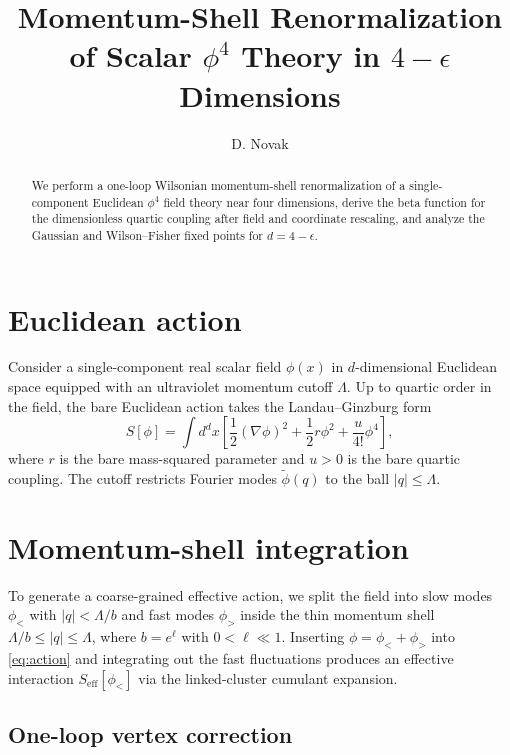 \documentclass{article}
\title{Momentum-Shell Renormalization of Scalar $\phi^4$ Theory in $4-\epsilon$ Dimensions}
\author{D. Novak}
\date{}
\begin{document}
\maketitle

\begin{abstract}
We perform a one-loop Wilsonian momentum-shell renormalization of a single-component
Euclidean $\phi^4$ field theory near four dimensions, derive the beta function for
the dimensionless quartic coupling after field and coordinate rescaling, and
analyze the Gaussian and Wilson--Fisher fixed points for $d = 4 - \epsilon$.
\end{abstract}

\section{Euclidean action}\label{sec:action}

Consider a single-component real scalar field $\phi(x)$ in $d$-dimensional
Euclidean space equipped with an ultraviolet momentum cutoff $\Lambda$. Up to
quartic order in the field, the bare Euclidean action takes the Landau--Ginzburg
form
\begin{equation}\label{eq:action}
  S[\phi] = \int d^d x \left[ \frac{1}{2}(\nabla \phi)^2 + \frac{1}{2} r \phi^2 + \frac{u}{4!} \phi^4 \right],
\end{equation}
where $r$ is the bare mass-squared parameter and $u > 0$ is the bare quartic
coupling. The cutoff restricts Fourier modes $\tilde{\phi}(q)$ to the ball
$|q| \leq \Lambda$.

\section{Momentum-shell integration}\label{sec:shell}

To generate a coarse-grained effective action, we split the field into slow modes
$\phi_{<}$ with $|q| < \Lambda / b$ and fast modes $\phi_{>}$ inside the thin
momentum shell $\Lambda / b \leq |q| \leq \Lambda$, where $b = e^{\ell}$ with
$0 < \ell \ll 1$. Inserting $\phi = \phi_{<} + \phi_{>}$ into \eqref{eq:action}
and integrating out the fast fluctuations produces an effective interaction
$S_{\mathrm{eff}}[\phi_{<}]$ via the linked-cluster cumulant expansion.

\subsection{One-loop vertex correction}\label{subsec:oneloop}
\end{document}
